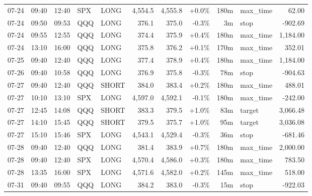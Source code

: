 \documentclass[11pt,a4paper,twoside]{article}
\begin{document}
\begin{center}
\begin{longtable}{>{\color{txtmain}}l l l l l r r r r >{\color{txtmain}}l r}
07-24 & 09:40 & 12:40 & SPX & LONG & 4,554.5 & 4,555.8 & \textcolor{wingreen}{+0.0\%} & 180m & max\_time & \textcolor{wingreen}{62.00} \\
07-24 & 09:50 & 09:53 & QQQ & LONG & 376.1 & 375.0 & \textcolor{lossred}{-0.3\%} & 3m & stop & \textcolor{lossred}{-902.69} \\
07-24 & 09:55 & 12:55 & QQQ & LONG & 374.4 & 375.9 & \textcolor{wingreen}{+0.4\%} & 180m & max\_time & \textcolor{wingreen}{1,184.00} \\
07-24 & 13:10 & 16:00 & QQQ & LONG & 375.8 & 376.2 & \textcolor{wingreen}{+0.1\%} & 170m & max\_time & \textcolor{wingreen}{352.01} \\
07-25 & 09:40 & 12:40 & QQQ & LONG & 377.4 & 378.9 & \textcolor{wingreen}{+0.4\%} & 180m & max\_time & \textcolor{wingreen}{1,184.00} \\
07-26 & 09:40 & 10:58 & QQQ & LONG & 376.9 & 375.8 & \textcolor{lossred}{-0.3\%} & 78m & stop & \textcolor{lossred}{-904.63} \\
07-27 & 09:40 & 12:40 & QQQ & SHORT & 384.0 & 383.4 & \textcolor{wingreen}{+0.2\%} & 180m & max\_time & \textcolor{wingreen}{488.01} \\
07-27 & 10:10 & 13:10 & SPX & LONG & 4,597.0 & 4,592.1 & \textcolor{lossred}{-0.1\%} & 180m & max\_time & \textcolor{lossred}{-242.00} \\
07-27 & 12:45 & 14:08 & QQQ & SHORT & 383.3 & 379.5 & \textcolor{wingreen}{+1.0\%} & 83m & target & \textcolor{wingreen}{3,066.48} \\
07-27 & 14:10 & 15:45 & QQQ & SHORT & 379.5 & 375.7 & \textcolor{wingreen}{+1.0\%} & 95m & target & \textcolor{wingreen}{3,036.08} \\
07-27 & 15:10 & 15:46 & SPX & LONG & 4,543.1 & 4,529.4 & \textcolor{lossred}{-0.3\%} & 36m & stop & \textcolor{lossred}{-681.46} \\
07-28 & 09:40 & 12:40 & QQQ & LONG & 381.4 & 383.9 & \textcolor{wingreen}{+0.7\%} & 180m & max\_time & \textcolor{wingreen}{2,000.00} \\
07-28 & 09:40 & 12:40 & SPX & LONG & 4,570.4 & 4,586.0 & \textcolor{wingreen}{+0.3\%} & 180m & max\_time & \textcolor{wingreen}{783.50} \\
07-28 & 13:35 & 16:00 & SPX & LONG & 4,571.6 & 4,582.0 & \textcolor{wingreen}{+0.2\%} & 145m & max\_time & \textcolor{wingreen}{518.00} \\
07-31 & 09:40 & 09:55 & QQQ & LONG & 384.2 & 383.0 & \textcolor{lossred}{-0.3\%} & 15m & stop & \textcolor{lossred}{-922.03} \\

\end{longtable}
\end{center}
\end{document}
